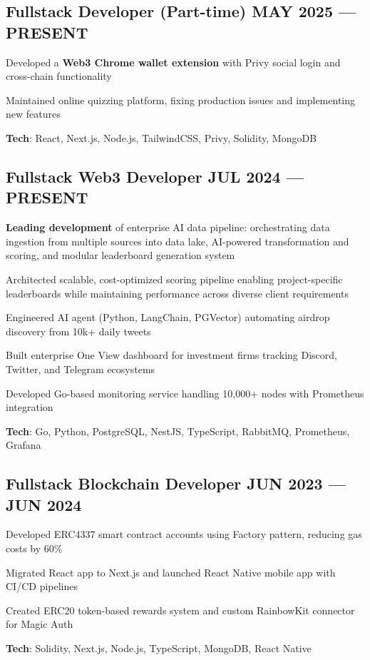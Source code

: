 \subsection{{Fullstack Developer (Part-time) \hfill MAY 2025 --- PRESENT}}\begin{zitemize}\item Developed a \textbf{Web3 Chrome wallet extension} with Privy social login and cross-chain functionality\item Maintained online quizzing platform, fixing production issues and implementing new features\item \textbf{Tech}: React, Next.js, Node.js, TailwindCSS, Privy, Solidity, MongoDB\end{zitemize}\subsection{{Fullstack Web3 Developer \hfill JUL 2024 --- PRESENT}}\begin{zitemize}\item \textbf{Leading development} of enterprise AI data pipeline: orchestrating data ingestion from multiple sources into data lake, AI-powered transformation and scoring, and modular leaderboard generation system\item Architected scalable, cost-optimized scoring pipeline enabling project-specific leaderboards while maintaining performance across diverse client requirements\item Engineered AI agent (Python, LangChain, PGVector) automating airdrop discovery from 10k+ daily tweets\item Built enterprise One View dashboard for investment firms tracking Discord, Twitter, and Telegram ecosystems\item Developed Go-based monitoring service handling 10,000+ nodes with Prometheus integration\item \textbf{Tech}: Go, Python, PostgreSQL, NestJS, TypeScript, RabbitMQ, Prometheus, Grafana\end{zitemize}\subsection{{ Fullstack Blockchain Developer \hfill JUN 2023 --- JUN 2024}}\begin{zitemize}\item Developed ERC4337 smart contract accounts using Factory pattern, reducing gas costs by 60\%\item Migrated React app to Next.js and launched React Native mobile app with CI/CD pipelines\item Created ERC20 token-based rewards system and custom RainbowKit connector for Magic Auth\item \textbf{Tech}: Solidity, Next.js, Node.js, TypeScript, MongoDB, React Native\end{zitemize}
